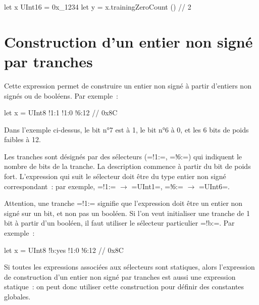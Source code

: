 \begin{OMNIBUS}
let x UInt16 = 0x_1234
let y = x.trainingZeroCount () // 2
\end{OMNIBUS}




\section{Construction d'un entier non signé par tranches}

Cette expression permet de construire un entier non signé à partir d'entiers non signés ou de booléens. Par exemple~:
\begin{OMNIBUS}
let x = {UInt8 !1:1 !1:0 !6:12} // 0x8C
\end{OMNIBUS}

Dans l'exemple ci-dessus, le bit n°7 est à 1, le bit n°6 à 0, et les 6 bits de poids faibles à 12.

Les tranches sont désignés par des sélecteurs (\omnibus=!1:=, \omnibus=!6:=) qui indiquent le nombre de bits de la tranche. La description commence à partir du bit de poids fort. L'expression qui suit le sélecteur doit être du type entier non signé correspondant~: par exemple, \omnibus=!1:= $\rightarrow$ \omnibus=UInt1=, \omnibus=!6:= $\rightarrow$ \omnibus=UInt6=.

Attention, une tranche \omnibus=!1:= signifie que l'expression doit être un entier non signé sur un bit, et non pas un booléen. Si l'on veut initialiser une tranche de 1 bit à partir d'un booléen, il faut utiliser le sélecteur particulier \omnibus=!b:=. Par exemple~:
\begin{OMNIBUS}
let x = {UInt8 !b:yes !1:0 !6:12} // 0x8C
\end{OMNIBUS}

Si toutes les expressions associées aux sélecteurs sont statiques, alors l'expression de construction d'un entier non signé par tranches est aussi une expression statique~: on peut donc utiliser cette construction pour définir des constantes globales.



